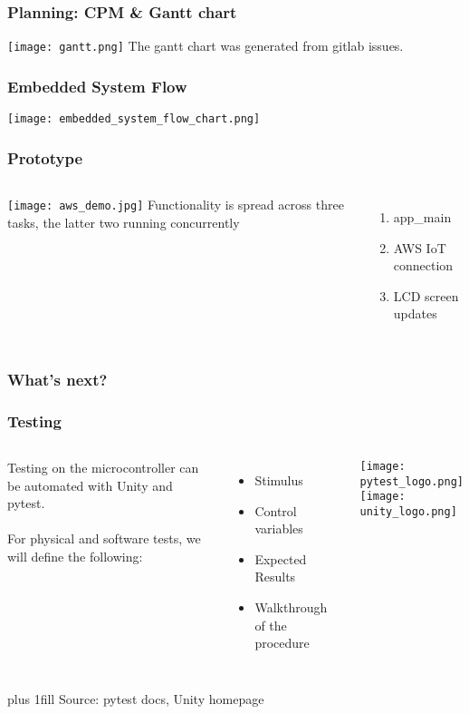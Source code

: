 \documentclass{beamer}
\begin{document}
\begin{frame}
  \frametitle{Planning: CPM \& Gantt chart}
  \texttt{[image: gantt.png]}
  The gantt chart was generated from gitlab issues.
\end{frame}

\begin{frame}
  \frametitle{Embedded System Flow}
  \texttt{[image: embedded\_system\_flow\_chart.png]}
\end{frame}

\begin{frame}
  \frametitle{Prototype}
  \begin{columns}
    \texttt{[image: aws\_demo.jpg]}
    Functionality is spread across three tasks, the latter two running concurrently
    \begin{enumerate}
      \item app\_main
      \item AWS IoT connection
      \item LCD screen updates
    \end{enumerate}
  \end{columns}
\end{frame}

\begin{frame}
  \frametitle{What's next?}
\end{frame}

\begin{frame}
  \frametitle{Testing}

  \begin{columns}
    Testing on the microcontroller can be automated with Unity and pytest.
    \\~\\
    For physical and software tests, we will define the following:
    \begin{itemize}
      \item Stimulus
      \item Control variables
      \item Expected Results
      \item Walkthrough of the procedure
    \end{itemize}

    \texttt{[image: pytest\_logo.png]} \\
    \texttt{[image: unity\_logo.png]}

  \end{columns}
  \vskip0pt plus 1fill
  \hfill {\tiny Source: pytest docs, Unity homepage}
\end{frame}
\end{document}
